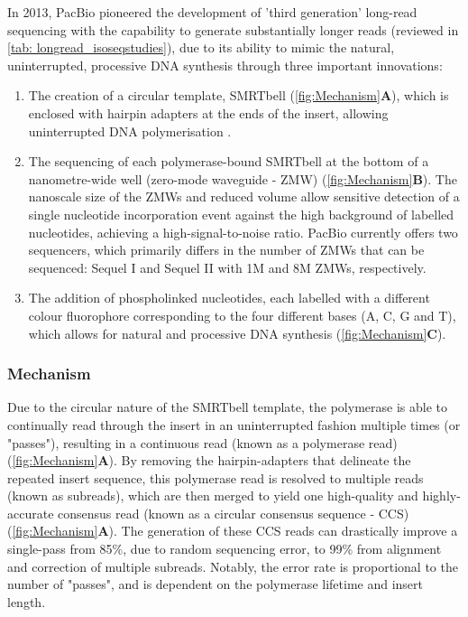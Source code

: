 In 2013, PacBio pioneered the development of 'third generation' long-read sequencing with the capability to generate substantially longer reads (reviewed in \cref{tab: longread_isoseqstudies}), due to its ability to mimic the natural, uninterrupted, processive DNA synthesis through three important innovations\cite{Eid2009}: 
\begin{enumerate}
	\item The creation of a circular template, SMRTbell (\cref{fig:Mechanism}\textbf{A}), which is enclosed with hairpin adapters at the ends of the insert, allowing uninterrupted DNA polymerisation \cite{Travers2010}.
	\item The sequencing of each polymerase-bound SMRTbell at the bottom of a nanometre-wide well (zero-mode waveguide - ZMW)\cite{Levene2003} (\cref{fig:Mechanism}\textbf{B}). The nanoscale size of the ZMWs and reduced volume allow sensitive detection of a single nucleotide incorporation event against the high background of labelled nucleotides, achieving a high-signal-to-noise ratio. PacBio currently offers two sequencers, which primarily differs in the number of ZMWs that can be sequenced: Sequel I and Sequel II with 1M and 8M ZMWs, respectively.   
	\item The addition of phospholinked nucleotides, each labelled with a different colour fluorophore corresponding to the four different bases (A, C, G and T), which allows for natural and processive DNA synthesis\cite{Mccarthy2010} (\cref{fig:Mechanism}\textbf{C}). 
\end{enumerate}

\subsubsection{Mechanism}
Due to the circular nature of the SMRTbell template, the polymerase is able to continually read through the insert in an uninterrupted fashion multiple times (or "passes"), resulting in a continuous read (known as a polymerase read) (\cref{fig:Mechanism}\textbf{A}). By removing the hairpin-adapters that delineate the repeated insert sequence, this polymerase read is resolved to multiple reads (known as subreads), which are then merged to yield one high-quality and highly-accurate consensus read (known as a circular consensus sequence - CCS) (\cref{fig:Mechanism}\textbf{A}). The generation of these CCS reads can drastically improve a single-pass from 85\%, due to random sequencing error, to 99\% from alignment and correction of multiple subreads. Notably, the error rate is proportional to the number of "passes", and is dependent on the polymerase lifetime and insert length\cite{Travers2010}. 

